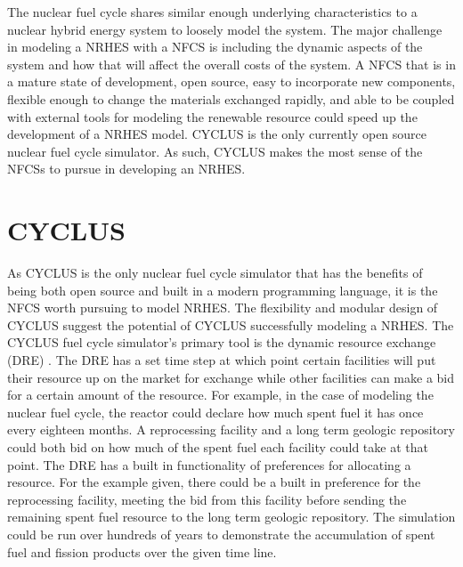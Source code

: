 \documentclass[12pt]{UIdahoMastersThesis}
\begin{document}
The nuclear fuel cycle shares similar enough underlying characteristics to a nuclear hybrid energy system to loosely model the system. The major challenge in modeling a NRHES with a NFCS is including the dynamic aspects of the system and how that will affect the overall costs of the system. A NFCS that is in a mature state of development, open source, easy to incorporate new components, flexible enough to change the materials exchanged rapidly, and able to be coupled with external tools for modeling the renewable resource could speed up the development of a NRHES model. CYCLUS is the only currently open source nuclear fuel cycle simulator.  As such, CYCLUS makes the most sense of the NFCSs to pursue in developing an NRHES.

\section{CYCLUS}

As CYCLUS is the only nuclear fuel cycle simulator that has the benefits of being both open source and built in a modern programming language, it is the NFCS worth pursuing to model NRHES. The flexibility and modular design of CYCLUS suggest the potential of CYCLUS successfully modeling a NRHES. The CYCLUS fuel cycle simulator's primary tool is the dynamic resource exchange (DRE) \cite{Huff2016}.  The DRE has a set time step at which point certain facilities will put their resource up on the market for exchange while other facilities can make a bid for a certain amount of the resource. For example, in the case of modeling the nuclear fuel cycle, the reactor could declare how much spent fuel it has once every eighteen months.  A reprocessing facility and a long term geologic repository could both bid on how much of the spent fuel each facility could take at that point.  The DRE has a built in functionality of preferences for allocating a resource.  For the example given, there could be a built in preference for the reprocessing facility, meeting the bid from this facility before sending the remaining spent fuel resource to the long term geologic repository. The simulation could be run over hundreds of years to demonstrate the accumulation of spent fuel and fission products over the given time line.
\end{document}
